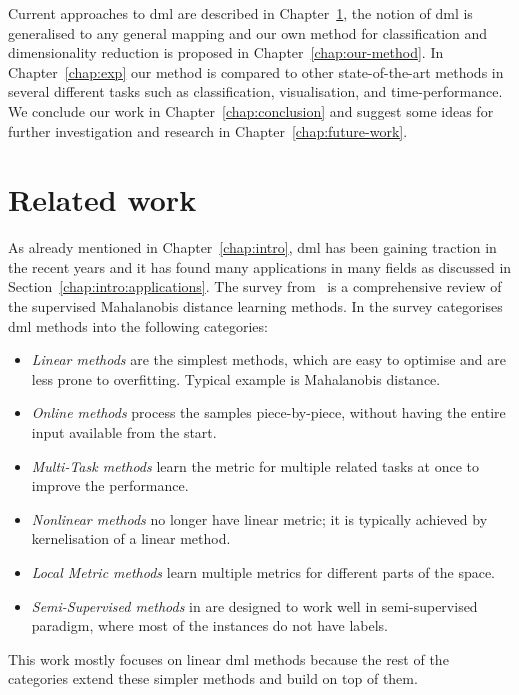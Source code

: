 Current approaches to \ac{dml} are described in Chapter~\ref{chap:rw}, the notion of \ac{dml} is generalised to any general mapping and our own method for classification and dimensionality reduction is proposed in Chapter~\ref{chap:our-method}. In Chapter~\ref{chap:exp} our method is compared to other state-of-the-art methods in several different tasks such as classification, visualisation, and time-performance. We conclude our work in Chapter~\ref{chap:conclusion} and suggest some ideas for further investigation and research in Chapter~\ref{chap:future-work}.


\chapter{Related work} \label{chap:rw}

As already mentioned in Chapter~\ref{chap:intro}, \ac{dml} has been gaining traction in the recent years and it has found many applications in many fields as discussed in Section~\ref{chap:intro:applications}. The survey from~\citep{bellet2013survey} is a comprehensive review of the supervised Mahalanobis distance learning methods. In the survey categorises \ac{dml} methods into the following categories: 
\begin{itemize}
\item \textit{Linear methods} are the simplest methods, which are easy to optimise and are less prone to overfitting. Typical example is Mahalanobis distance.
\item \textit{Online methods} process the samples piece-by-piece, without having the entire input available from the start.
\item \textit{Multi-Task methods} learn the metric for multiple related tasks at once to improve the performance.
\item \textit{Nonlinear methods} no longer have linear metric; it is typically achieved by kernelisation of a linear method.
\item \textit{Local Metric methods} learn multiple metrics for different parts of the space.
\item \textit{Semi-Supervised methods} in are designed to work well in semi-supervised paradigm, where most of the instances do not have labels.
\end{itemize}
This work mostly focuses on linear \ac{dml} methods because the rest of the categories extend these simpler methods and build on top of them.

